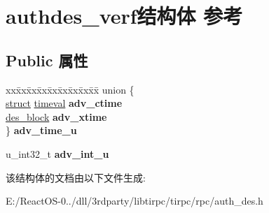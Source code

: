 \hypertarget{structauthdes__verf}{}\section{authdes\+\_\+verf结构体 参考}
\label{structauthdes__verf}
\subsection*{Public 属性}
\begin{DoxyCompactItemize}
\item 
\mbox{\label{structauthdes__verf_a3a98241c44483ee3047f8857eba1dc38}} 
\begin{tabbing}
xx\=xx\=xx\=xx\=xx\=xx\=xx\=xx\=xx\=\kill
union \{\\
\>\hyperlink{interfacestruct}{struct} \hyperlink{structtimeval}{timeval} {\bfseries adv\_ctime}\\
\>\hyperlink{uniondes__block}{des\_block} {\bfseries adv\_xtime}\\
\} {\bfseries adv\_time\_u}\\

\end{tabbing}\item 
\mbox{\label{structauthdes__verf_ae18dde7f3911740cd4e0fe251d990494}} 
u\+\_\+int32\+\_\+t {\bfseries adv\+\_\+int\+\_\+u}
\end{DoxyCompactItemize}


该结构体的文档由以下文件生成\+:\begin{DoxyCompactItemize}
\item 
E\+:/\+React\+O\+S-\/0../dll/3rdparty/libtirpc/tirpc/rpc/auth\+\_\+des.\+h\end{DoxyCompactItemize}
